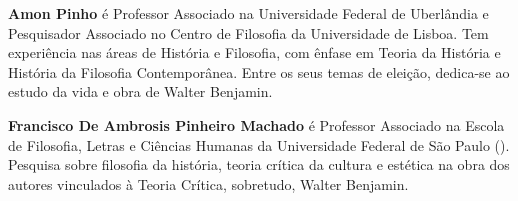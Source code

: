 \textbf{Amon Pinho} é Professor Associado na Universidade Federal de Uberlândia e Pesquisador Associado no Centro de Filosofia da Universidade de Lisboa. Tem experiência nas áreas de História e Filosofia, com ênfase em Teoria da História e História da Filosofia Contemporânea. Entre os seus temas de eleição, dedica-se ao estudo da vida e obra de Walter Benjamin.

\textbf{Francisco De Ambrosis Pinheiro Machado} é Professor Associado na Escola de Filosofia, Letras e Ciências Humanas da Universidade Federal de São Paulo (). Pesquisa sobre filosofia da história, teoria crítica da cultura e estética na obra dos autores vinculados à Teoria Crítica, sobretudo, Walter Benjamin.



